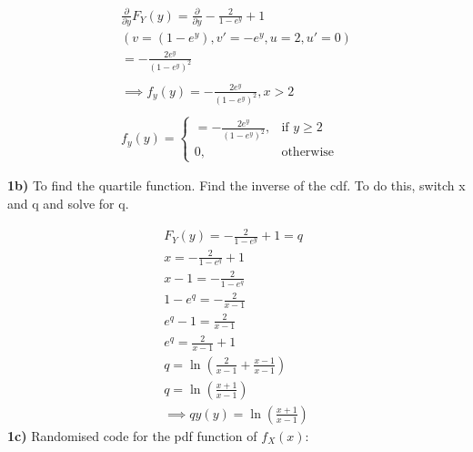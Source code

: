 \documentclass[oneside, a4paper]{article}
\begin{document}
\begin{equation}
    \begin{split}
    \frac{\partial }{\partial y} F_Y(y) = \frac{\partial }{\partial y}-\frac{2}{1 - e^y} + 1 \\
    \left(v = (1 - e^y), v' = -e^y, u = 2, u' = 0  \right)\\
    = -\frac{2e^y}{\left(1 -e^y \right)^2} \\\\
    \implies f_y(y) = -\frac{2e^y}{\left(1 -e^y \right)^2}, x > 2 \\\\
        f_y(y)= 
    \begin{cases}
        = -\frac{2e^y}{\left(1 -e^y \right)^2},& \text{if } y\geq 2\\
        0,              & \text{otherwise}
    \end{cases}
    \end{split}
\end{equation}

\textbf{1b)} To find the quartile function. Find the inverse of the cdf. To do this, switch x and q and solve for q.

\begin{equation}
    \begin{split}
    F_Y(y) = -\frac{2}{1 - e^y} + 1 = q \\
    x = -\frac{2}{1 - e^q} + 1 \\
    x - 1 = -\frac{2}{1 - e^q} \\ 
    1 - e^q = -\frac{2}{x - 1} \\ 
    e^q - 1 = \frac{2}{x - 1} \\ 
    e^q = \frac{2}{x - 1} + 1 \\ 
    q = \ln{\left(\frac{2}{x - 1} + \frac{x - 1}{x - 1}\right)} \\ 
    q = \ln{\left(\frac{x + 1}{x - 1}\right)} \\ 
    \implies qy(y) = \ln{\left(\frac{x + 1}{x - 1}\right)}
    \end{split}
\end{equation} 
\textbf{1c)} Randomised code for the pdf function of $f_X(x)$:
\end{document}
